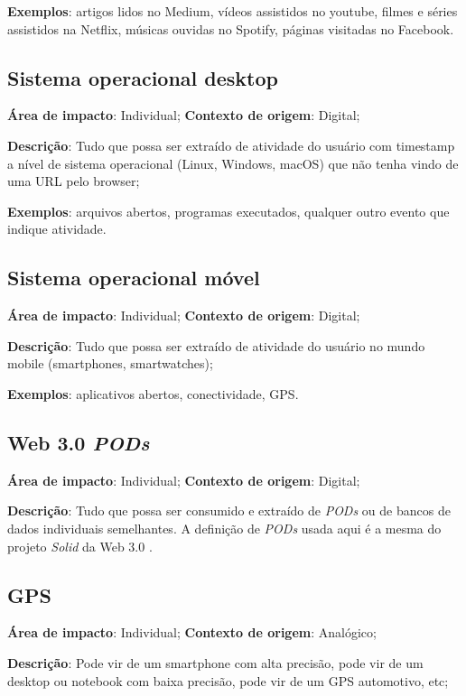 \textbf{Exemplos}: artigos lidos no Medium, vídeos assistidos no youtube, filmes e séries assistidos na Netflix, músicas ouvidas no Spotify, páginas visitadas no Facebook.

\subsection{Sistema operacional desktop}

\textbf{Área de impacto}: Individual; \textbf{Contexto de origem}: Digital;

\textbf{Descrição}: Tudo que possa ser extraído de atividade do usuário com timestamp a nível de sistema operacional (Linux, Windows, macOS) que não tenha vindo de uma URL pelo browser;

\textbf{Exemplos}: arquivos abertos, programas executados, qualquer outro evento que indique atividade.

\subsection{Sistema operacional móvel}

\textbf{Área de impacto}: Individual; \textbf{Contexto de origem}: Digital;

\textbf{Descrição}: Tudo que possa ser extraído de atividade do usuário no mundo mobile (smartphones, smartwatches);

\textbf{Exemplos}: aplicativos abertos, conectividade, GPS.

\subsection{Web 3.0 \textit{PODs}}

\textbf{Área de impacto}: Individual; \textbf{Contexto de origem}: Digital;

\textbf{Descrição}: Tudo que possa ser consumido e extraído de \textit{PODs} ou de bancos de dados individuais semelhantes. A definição de \textit{PODs} usada aqui é a mesma do projeto \textit{Solid} da Web 3.0 \cite{solid}.

\subsection{GPS}

\textbf{Área de impacto}: Individual; \textbf{Contexto de origem}: Analógico;

\textbf{Descrição}: Pode vir de um smartphone com alta precisão, pode vir de um desktop ou notebook com baixa precisão, pode vir de um GPS automotivo, etc;

